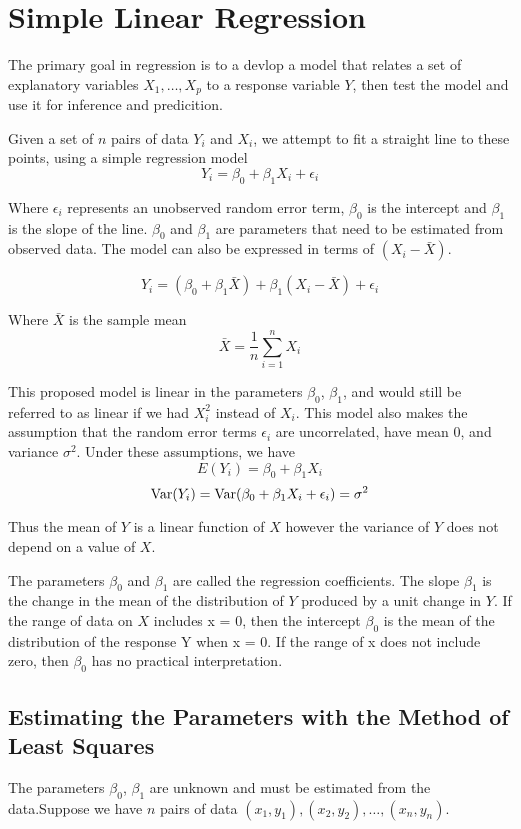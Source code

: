 \chapter{Simple Linear Regression}


The primary goal in regression is to a devlop a model that relates a set of explanatory variables $X_1, \ldots, X_p$ to a response variable $Y$, then test the model and use it for inference and predicition. 

Given a set of $n$ pairs of data $Y_i$ and $X_i$, we attempt to fit a straight line to these points, using a simple regression model 
\[Y_i = \beta_0 + \beta_1X_i + \epsilon_i\]

Where $\epsilon_i$ represents an unobserved random error term, $\beta_0$ is the intercept and $\beta_1$ is the slope of the line. $\beta_0$ and $\beta_1$ are parameters that need to be estimated from observed data. The model can also be expressed in terms of $(X_i - \bar{X})$.

\[Y_i = (\beta_0 + \beta_1\bar{X}) + \beta_1(X_i - \bar{X}) + \epsilon_i\]

Where $\bar{X}$ is the sample mean 
\[\bar{X} = \frac{1}{n}\sum_{i=1}^n  X_i \]

This proposed model is linear in the parameters $\beta_0$, $\beta_1$, and would still be referred to as linear if we had $X_i^2$ instead of $X_i$. This model also makes the assumption that the random error terms $\epsilon_i$ are uncorrelated, have mean 0, and variance $\sigma^2$. Under these assumptions, we have 
\[E(Y_i) = \beta_0 + \beta_1 X_i\]
\[\operatorname{Var}(Y_i) = \operatorname{Var}(\beta_0 + \beta_1X_i + \epsilon_i) = \sigma^2\]

Thus the mean of $Y$ is a linear function of $X$ however the variance of $Y$ does not depend on a value of $X$. 

The parameters $\beta_0$ and $\beta_1$ are called the regression coefficients. The slope $\beta_1$ is the change in the mean of the distribution of $Y$ produced by a unit change in $Y$. If the range of data on $X$ includes x = 0, then the intercept $\beta_0$ is the mean of the distribution of the response Y when x = 0. If the range of x does not include zero, then $\beta_0$ has no practical interpretation.

\section{Estimating the Parameters with the Method of Least Squares}

The parameters $\beta_0$, $\beta_1$ are unknown and must be estimated from the data.Suppose we have $n$ pairs of data $(x_1, y_1), (x_2,y_2), \ldots, (x_n,y_n)$.

